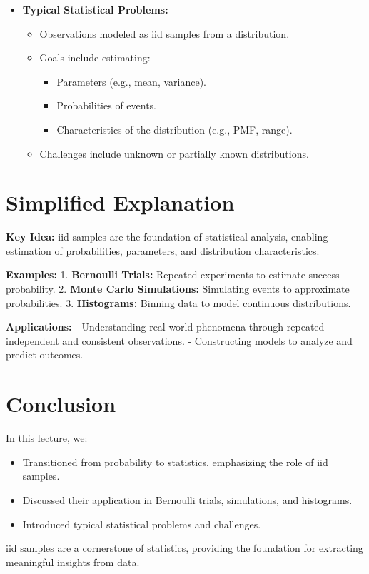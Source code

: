 \documentclass{article}
\begin{document}
\begin{itemize}
  \item \textbf{Typical Statistical Problems:}
    \begin{itemize}
      \item Observations modeled as iid samples from a distribution.
      \item Goals include estimating:
        \begin{itemize}
          \item Parameters (e.g., mean, variance).
          \item Probabilities of events.
          \item Characteristics of the distribution (e.g., PMF, range).
        \end{itemize}
      \item Challenges include unknown or partially known distributions.
    \end{itemize}
\end{itemize}

\section*{Simplified Explanation}

\textbf{Key Idea:}
iid samples are the foundation of statistical analysis, enabling estimation of probabilities, parameters, and distribution characteristics.

\textbf{Examples:}
1. \textbf{Bernoulli Trials:} Repeated experiments to estimate success probability.
2. \textbf{Monte Carlo Simulations:} Simulating events to approximate probabilities.
3. \textbf{Histograms:} Binning data to model continuous distributions.

\textbf{Applications:}
- Understanding real-world phenomena through repeated independent and consistent observations.
- Constructing models to analyze and predict outcomes.

\section*{Conclusion}

In this lecture, we:
\begin{itemize}
  \item Transitioned from probability to statistics, emphasizing the role of iid samples.
  \item Discussed their application in Bernoulli trials, simulations, and histograms.
  \item Introduced typical statistical problems and challenges.
\end{itemize}

iid samples are a cornerstone of statistics, providing the foundation for extracting meaningful insights from data.
\end{document}
